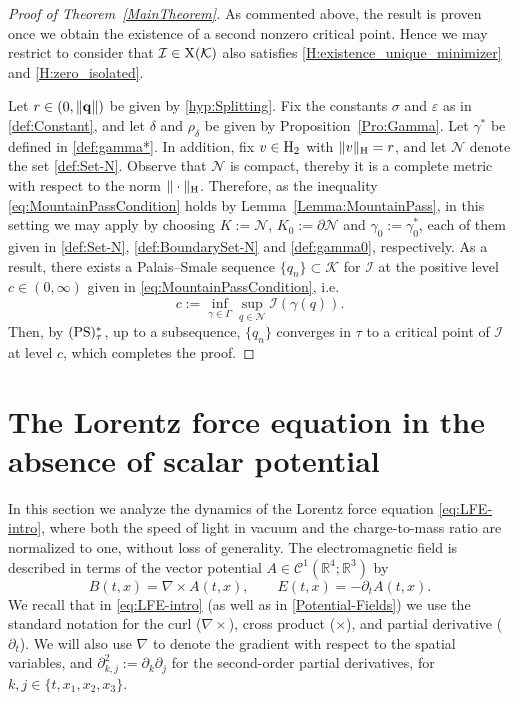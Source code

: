 \documentclass{article}
\newcommand{\boK}{\mathcal{K}}
\newcommand{\boI}{\mathcal{I}}
\newcommand{\R}{\mathbb{R}}
\newcommand{\boN}{\mathcal{N}}
\newcommand{\Hilb}{{\textnormal H}}
\newcommand{\minq}{{\bf q}}
\newcommand{\X}{{\textnormal X}}
\newcommand{\PS}{(\textnormal{PS})^{*}_\tau}
\theoremstyle{definition}
\begin{document}
\begin{proof}[Proof of Theorem~\ref{MainTheorem}]

As commented above, the result is proven once we obtain the existence of a second nonzero critical point. Hence we may restrict to consider that $\boI\in\X(\boK)$ also satisfies \eqref{H:existence_unique_minimizer} and \eqref{H:zero_isolated}.


Let $r\in(0,\|\minq\|)$ be given by \eqref{hyp:Splitting}. Fix the constants $\sigma$ and $\varepsilon$ as in \eqref{def:Constant}, and let $\delta$ and $\rho_\delta$ be given by Proposition~\ref{Pro:Gamma}. Let $\gamma^*$ be defined in \eqref{def:gamma*}. In addition, fix $v\in\Hilb_2$ with $\|v\|_\Hilb=r$, and let $\boN$ denote the set \eqref{def:Set-N}. Observe that $\boN$ is compact, thereby it is a complete metric with respect to the norm $\|\cdot\|_\Hilb$. Therefore, as the inequality \eqref{eq:MountainPassCondition} holds by Lemma~\ref{Lemma:MountainPass}, in this setting we may apply \cite[Theorem 1]{ABT} by choosing $K:=\boN$, $K_0:=\partial\boN$ and $\gamma_0:=\gamma_0^*$, each of them given in \eqref{def:Set-N}, \eqref{def:BoundarySet-N} and \eqref{def:gamma0}, respectively. As a result, there exists a Palais–Smale sequence $\{q_n\} \subset \boK$ for $\boI$ at the positive level $c\in(0,\infty)$ given in \eqref{eq:MountainPassCondition}, i.e.
\begin{equation}
c:=\inf_{\gamma\in\Gamma}\sup_{q\in\boN}\boI(\gamma(q)).
\end{equation}
Then, by  $\PS$, up to a subsequence, $\{q_n\}$ converges in $\tau$ to a critical point of $\boI$ at level $c$, which completes the proof.
\end{proof}

\section{The Lorentz force equation in the absence of scalar potential}\label{Sect:LFE}
	In this section we analyze the dynamics of the Lorentz force equation \eqref{eq:LFE-intro}, where both the speed of light in vacuum and the charge-to-mass ratio are normalized to one, without loss of generality. The electromagnetic field is described in terms of the vector potential $A\in\mathcal{C}^1(\R^4;\R^3)$ by
	\begin{equation}\label{Potential-Fields}
		B(t,x)=\nabla\times A (t,x),\qquad E(t,x)=-\partial_t A(t,x).
	\end{equation}
	 We recall that in \eqref{eq:LFE-intro} (as well as in \eqref{Potential-Fields}) we use the standard notation for the curl ($\nabla\times$), cross product ($\times$), and partial derivative ($\partial_t$). We will also use $\nabla$ to denote the gradient with respect to the spatial variables, and $\partial^2_{k,j}:=\partial_k\partial_j$ for the second-order partial derivatives, for $k,j\in\{t,x_1,x_2,x_3\}$.
	
\end{document}
